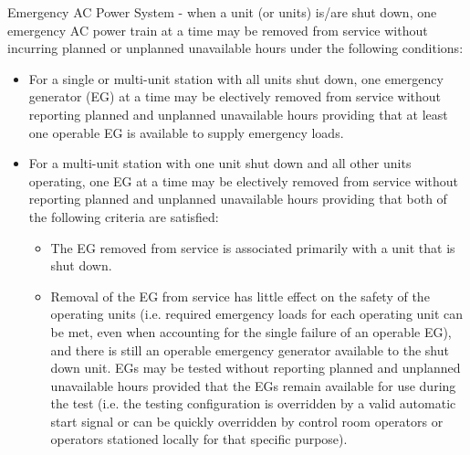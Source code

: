 Emergency AC Power System - when a unit (or units) is/are shut down,
one emergency AC power train at a time may be removed from service
without incurring planned or unplanned unavailable hours under the
following conditions:
\begin{itemize}
\item For a single or multi-unit station with all units shut down, one emergency generator (EG) at a time may be electively removed from service without reporting planned and unplanned unavailable hours providing that at least one operable EG is available to supply emergency loads.
\item For a multi-unit station with one unit shut down and all other
  units operating, one EG at a time may be electively removed from
  service without reporting planned and unplanned unavailable hours
  providing that both of the following criteria are satisfied:
  \begin{itemize}

  \item The EG removed from service is associated primarily with a unit that is shut down.

  \item Removal of the EG from service has little effect on the safety of the operating units (i.e. required emergency loads for each operating unit can be met, even when accounting for the single failure of an operable EG), and there is still an operable emergency generator available to the shut down unit.
EGs may be tested without reporting planned and unplanned unavailable
hours provided that the EGs remain available for use during the test
(i.e. the testing configuration is overridden by a valid automatic
start signal or can be quickly overridden by control room operators or
operators stationed locally for that specific purpose).
\end{itemize}


\end{itemize}
